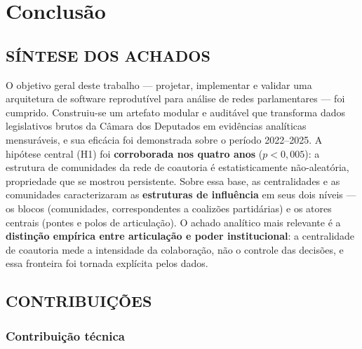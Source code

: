 \documentclass[
      12pt,
      a4paper,
      openright,
      oneside,
      chapter=TITLE,
      section=TITLE,
      english,
      french,
      spanish,
      brazilian
    ]{abntex2}
\begin{document}
    \chapter{Conclusão}
    \label{cap:conclusao}
    
    
    \section{SÍNTESE DOS ACHADOS}
    
    O objetivo geral deste trabalho --- projetar, implementar e validar uma arquitetura de software reprodutível para análise de redes parlamentares --- foi cumprido. Construiu-se um artefato modular e auditável que transforma dados legislativos brutos da Câmara dos Deputados em evidências analíticas mensuráveis, e sua eficácia foi demonstrada sobre o período 2022--2025. A hipótese central (H1) foi \textbf{corroborada nos quatro anos} ($p<0{,}005$): a estrutura de comunidades da rede de coautoria é estatisticamente não-aleatória, propriedade que se mostrou persistente. Sobre essa base, as centralidades e as comunidades caracterizaram as \textbf{estruturas de influência} em seus dois níveis --- os blocos (comunidades, correspondentes a coalizões partidárias) e os atores centrais (pontes e polos de articulação). O achado analítico mais relevante é a \textbf{distinção empírica entre articulação e poder institucional}: a centralidade de coautoria mede a intensidade da colaboração, não o controle das decisões, e essa fronteira foi tornada explícita pelos dados.
    
    \section{CONTRIBUIÇÕES}
    
    \subsection{Contribuição técnica}
    
\end{document}
